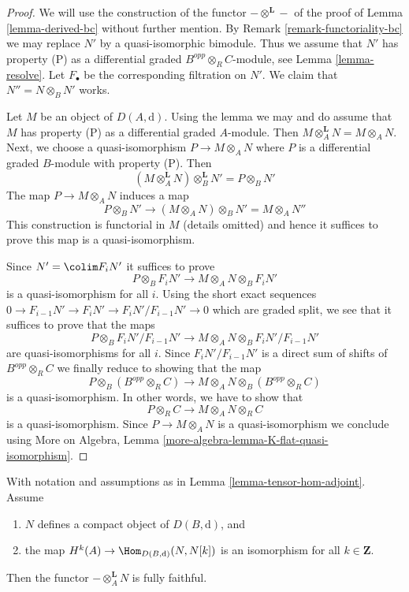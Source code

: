 \begin{proof}
We will use the construction of the functor $- \otimes^\mathbf{L} -$
of the proof of Lemma \ref{lemma-derived-bc} without further mention.
By Remark \ref{remark-functoriality-bc} we may replace $N'$ by a
quasi-isomorphic bimodule. Thus we assume that $N'$ has property (P) as a
differential graded $B^{opp} \otimes_R C$-module, see
Lemma \ref{lemma-resolve}. Let $F_\bullet$ be the corresponding
filtration on $N'$. We claim that $N'' = N \otimes_B N'$ works.

\medskip\noindent
Let $M$ be an object of $D(A, \text{d})$.
Using the lemma we may and do assume that $M$ has property (P) as a
differential graded $A$-module. Then
$M \otimes_A^\mathbf{L} N = M \otimes_A N$.
Next, we choose a quasi-isomorphism $P \to M \otimes_A N$ where $P$
is a differential graded $B$-module with property (P).
Then
$$
(M \otimes_A^\mathbf{L} N) \otimes_B^\mathbf{L} N' =
P \otimes_B N'
$$
The map $P \to M \otimes_A N$ induces a map
$$
P \otimes_B N' \to (M \otimes_A N) \otimes_B N' = M \otimes_A N''
$$
This construction is functorial in $M$ (details omitted) and
hence it suffices to prove this map is a quasi-isomorphism.

\medskip\noindent
Since $N' = \colim F_iN'$ it suffices to prove
$$
P \otimes_B F_iN' \to M \otimes_A N \otimes_B F_iN'
$$
is a quasi-isomorphism for all $i$. Using the short exact sequences
$
0 \to F_{i - 1}N' \to F_iN' \to F_iN'/F_{i - 1}N' \to 0
$
which are graded split, we see that it suffices to prove that the maps
$$
P \otimes_B F_iN'/F_{i - 1}N' \to M \otimes_A N \otimes_B F_iN'/F_{i - 1}N'
$$
are quasi-isomorphisms for all $i$. Since $F_iN'/F_{i - 1}N'$ is a direct
sum of shifts of $B^{opp} \otimes_R C$ we finally reduce to showing
that the map
$$
P \otimes_B (B^{opp} \otimes_R C) \to
M \otimes_A N \otimes_B (B^{opp} \otimes_R C)
$$
is a quasi-isomorphism. In other words, we have to show that
$$
P \otimes_R C \to M \otimes_A N \otimes_R C
$$
is a quasi-isomorphism. Since $P \to  M \otimes_A N$ is a quasi-isomorphism
we conclude using
More on Algebra, Lemma \ref{more-algebra-lemma-K-flat-quasi-isomorphism}.
\end{proof}

\begin{lemma}
\label{lemma-tensor-with-compact-fully-faithful}
With notation and assumptions as in Lemma \ref{lemma-tensor-hom-adjoint}.
Assume
\begin{enumerate}
\item $N$ defines a compact object of $D(B, \text{d})$, and
\item the map $H^k(A) \to \Hom_{D(B, \text{d})}(N, N[k])$ is an
isomorphism for all $k \in \mathbf{Z}$.
\end{enumerate}
Then the functor $-\otimes_A^\mathbf{L} N$ is fully faithful.
\end{lemma}

